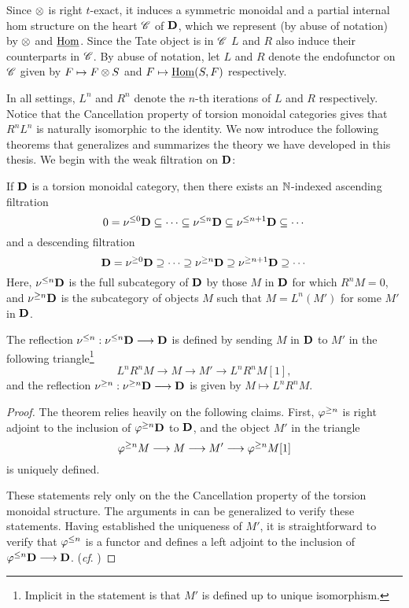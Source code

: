 Since $\otimes$ is right $t$-exact, it induces a symmetric 
monoidal and a partial internal hom structure on the heart 
$\mathscr{C}$ of $\mathbf{D}$, which we represent (by abuse of notation)
by $\otimes$ and $\underline{\mathrm{Hom}}$. Since the Tate object is in $\mathscr{C}$
$L$ and $R$ also induce their counterparts in $\mathscr{C}$. By
abuse of notation, let $L$ and $R$ denote the endofunctor on 
$\mathscr{C}$ given by $F \mapsto F \otimes S$ and $F \mapsto
\underline{\mathrm{Hom}}(S, F)$ respectively.

In all settings, $L^n$ and $R^n$ denote the $n$-th iterations
of $L$ and $R$ respectively. Notice that the Cancellation 
property of torsion monoidal categories gives that $R^nL^n$
is naturally isomorphic to the identity. We now introduce the 
following theorems that generalizes and summarizes the theory we 
have developed in this thesis. We begin with the weak filtration
on $\mathbf{D}$:

\begin{thm}\label{thm_summary_triang_cat}
If $\mathbf{D}$ is a torsion monoidal category, then there exists
an $\mathbb{N}$-indexed ascending filtration
\[
0 = \nu^{\leq 0}\mathbf{D} \subseteq \cdots \subseteq \nu^{\leq n}\mathbf{D} 
   \subseteq \nu^{\leq n + 1}\mathbf{D} \subseteq \cdots
\]
and a descending filtration
\[
\mathbf{D} = \nu^{\geq 0}\mathbf{D} \supseteq \cdots \supseteq \nu^{\geq n}\mathbf{D} 
\supseteq \nu^{\geq n + 1}\mathbf{D} \supseteq \cdots
\]
Here, $\nu^{\leq n}\mathbf{D}$ is the full subcategory of $\mathbf{D}$ by those 
$M$ in $\mathbf{D}$ for which $R^n M = 0$, and $\nu^{\geq n} \mathbf{D}$ is 
the subcategory of objects $M$ such that $M = L^n(M')$ for some
$M'$ in $\mathbf{D}$.

The reflection $\nu^{\leq n} : \nu^{\leq n} \mathbf{D} \longrightarrow \mathbf{D}$ is defined 
by sending $M$ in $\mathbf{D}$ to $M'$ in the following 
triangle\footnote{Implicit in the statement is that $M'$ is 
defined up to unique isomorphism.}
\[
L^nR^n M \to M \to M' \to L^nR^n M[1],
\]
and the reflection $\nu^{\geq n} : \nu^{\geq n}\mathbf{D} \longrightarrow \mathbf{D}$ is
given by $M \mapsto L^nR^n M$.
\end{thm}
\begin{proof}
The theorem relies heavily on the following claims. First, 
$\varphi^{\geq n}$ is right adjoint to the inclusion of 
$\varphi^{\geq n}\mathbf{D}$ to $\mathbf{D}$, and the object $M'$ in the triangle
\[
\varphi^{\geq n}M \longrightarrow M \longrightarrow M' \longrightarrow \varphi^{\geq n}M[1]
\]
is uniquely defined.

These statements rely only on the the Cancellation property of the 
torsion monoidal structure. The arguments in \cite[1.1, 1.4i]{HuKa}
can be generalized to verify these statements. Having established
the uniqueness of $M'$, it is straightforward to verify that 
$\varphi^{\leq n}$ is a functor and defines a left adjoint to the 
inclusion of $\varphi^{\leq n}\mathbf{D} \longrightarrow \mathbf{D}$. (\emph{cf}. \cite[1.4]{HuKa})
\end{proof}

